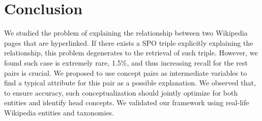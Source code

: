 \section{Conclusion}
\label{sec:conclusion}

We studied the problem of explaining the relationship between two Wikipedia pages that are hyperlinked. 
If there exists a SPO triple explicitly explaining the relationship, this problem degenerates to the retrieval of such triple. 
However, we found such case is extremely rare, 1.5\%, and thus increasing recall for the rest pairs is crucial. We proposed to use concept pairs as intermediate variables to find a typical attribute for this pair as a possible explanation. We observed that, to ensure accuracy, such conceptualization should jointly optimize for both entities and identify head concepts. We validated our framework using real-life Wikipedia entities and taxonomies.
